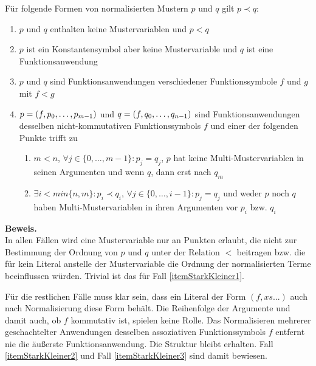 \begin{lemma} \label{lemStarkKleinerFaelle}
Für folgende Formen von normalisierten Mustern $p$ und $q$ gilt $p \prec q$:
\begin{enumerate}
	\item{$p$ und $q$ enthalten keine Mustervariablen und $p < q$} \label{itemStarkKleiner1}
	
	\item{$p$ ist ein Konstantensymbol aber keine Mustervariable und $q$ ist eine Funktionsanwendung}  \label{itemStarkKleiner2}
	
	\item{$p$ und $q$ sind Funktionsanwendungen verschiedener Funktionssymbole $f$ und $g$ mit $f < g$}  \label{itemStarkKleiner3}
		
	\item{$p = (f, {p}_{0}, \dots, {p}_{m-1})$ und $q = (f, {q}_{0}, \dots, {q}_{n-1})$ sind Funktionsanwendungen desselben nicht-kommutativen Funktionssymbols $f$ und einer der folgenden Punkte trifft zu
	\begin{enumerate}
		\item{$m < n$, $\forall j \in \{0, \dots, m-1\} \colon p_j = q_j$, $p$ hat keine Multi-Mustervariablen in seinen Argumenten und wenn $q$, dann erst nach $q_m$}
		\item{$\exists i < min\{n, m\} \colon p_i \prec q_i$, $\forall j \in \{0, \dots, i  - 1\} \colon p_j = q_j$ und weder $p$ noch $q$ haben Multi-Mustervariablen in ihren Argumenten vor $p_i$ bzw. $q_i$}
	\end{enumerate}
	} \label{itemStarkKleiner4}
	
\end{enumerate}
\end{lemma}

\textbf{Beweis.}~\\
In allen Fällen wird eine Mustervariable nur an Punkten erlaubt, die nicht zur Bestimmung der Ordnung von $p$ und $q$ unter der Relation $<$ beitragen bzw. die für kein Literal anstelle der Mustervariable die Ordnung der normalisierten Terme beeinflussen würden. Trivial ist das für Fall \ref{itemStarkKleiner1}.

Für die restlichen Fälle muss klar sein, dass ein Literal der Form $(f, xs...)$ auch nach Normalisierung diese Form behält. Die Reihenfolge der Argumente und damit auch, ob $f$ kommutativ ist, spielen keine Rolle. Das Normalisieren mehrerer geschachtelter Anwendungen desselben assoziativen Funktionssymbols $f$ entfernt nie die äußerste Funktionsanwendung. Die Struktur bleibt erhalten.
Fall \ref{itemStarkKleiner2} und Fall \ref{itemStarkKleiner3} sind damit bewiesen.

